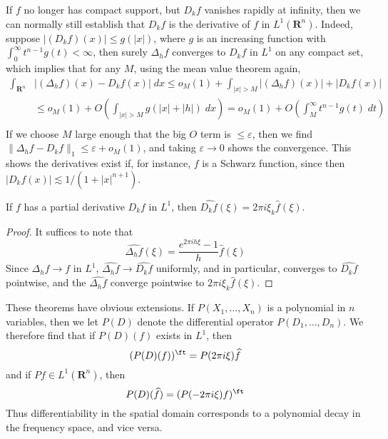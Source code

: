 \begin{remark}
	If $f$ no longer has compact support, but $D_k f$ vanishes rapidly at infinity, then we can normally still establish that $D_k f$ is the derivative of $f$ in $L^1(\mathbf{R}^n)$. Indeed, suppose $|(D_k f)(x)| \leq g(|x|)$, where $g$ is an increasing function with $\int_0^\infty t^{n-1} g(t) < \infty$, then surely $\Delta_h f$ converges to $D_k f$ in $L^1$ on any compact set, which implies that for any $M$, using the mean value theorem again,
	\begin{align*}
		\int_{\mathbf{R}^n} &|(\Delta_h f)(x) - D_k f(x)|\; dx \leq o_M(1) + \int_{|x| > M} |(\Delta_h f)(x)| + |D_k f(x)| \\
		&\leq o_M(1) + O \left( \int_{|x| > M} g(|x| + |h|)\; dx \right) = o_M(1) + O \left( \int_M^\infty t^{n-1}g(t)\; dt \right)\\
	\end{align*}
	If we choose $M$ large enough that the big $O$ term is $\leq \varepsilon$, then we find $\| \Delta_h f - D_k f \|_1 \leq \varepsilon + o_M(1)$, and taking $\varepsilon \to 0$ shows the convergence. This shows the derivatives exist if, for instance, $f$ is a Schwarz function, since then $|D_k f(x)| \lesssim 1/(1 + |x|^{n+1})$.
\end{remark}

\begin{theorem}
	If $f$ has a partial derivative $D_k f$ in $L^1$, then $\widehat{D_k f}(\xi) = 2 \pi i \xi_k \widehat{f}(\xi)$.
\end{theorem}
\begin{proof}
	It suffices to note that
	\[ \widehat{\Delta_h f}(\xi) = \frac{e^{2 \pi i h \xi} - 1}{h} \widehat{f}(\xi) \]
	Since $\Delta_h f \to f$ in $L^1$, $\widehat{\Delta_h f} \to \widehat{D_k f}$ uniformly, and in particular, converges to $\widehat{D_k f}$ pointwise, and the $\widehat{\Delta_h f}$ converge pointwise to $2 \pi i \xi_k \widehat{f}(\xi)$.
\end{proof}

These theorems have obvious extensions. If $P(X_1, \dots, X_n)$ is a polynomial in $n$ variables, then we let $P(D)$ denote the differential operator $P(D_1, \dots, D_n)$. We therefore find that if $P(D)(f)$ exists in $L^1$, then
%
\[ (P(D)(f))^\ft = P(2 \pi i \xi) \widehat{f} \]
%
and if $Pf \in L^1(\mathbf{R}^n)$, then
%
\[ P(D)(\widehat{f}) = (P(-2 \pi i \xi) f)^\ft \]
%
Thus differentiability in the spatial domain corresponds to a polynomial decay in the frequency space, and vice versa.

